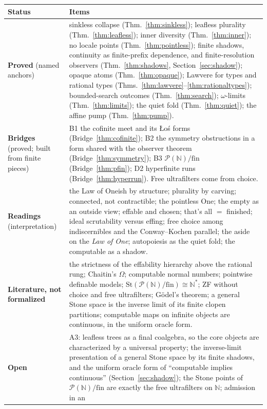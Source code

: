 \documentclass[]{article}
\theoremstyle{definition}
\theoremstyle{remark}
\newcommand{\N}{\mathbb{N}}
\newcommand{\Om}{\Omega}
\newcommand{\Nstar}{\N^{*}}
\newcommand{\Pfin}{\mathcal{P}(\N)/\mathrm{fin}}
\begin{document}
\begin{table}[H]
\centering\small
\begin{tabular}{@{}L{0.25\textwidth}L{0.69\textwidth}@{}}
\toprule
Status & Items \\
\midrule
\textbf{Proved} (named anchors) &
  sinkless collapse (Thm.~\ref{thm:sinkless}); leafless plurality (Thm.~\ref{thm:leafless}); inner
  diversity (Thm.~\ref{thm:inner}); no locale points (Thm.~\ref{thm:pointless}); finite shadows,
  continuity as finite-prefix dependence, and finite-resolution observers (Thm.~\ref{thm:shadows},
  Section~\ref{sec:shadow}); opaque atoms
  (Thm.~\ref{thm:opaque}); Lawvere for types and rational
  types (Thms.~\ref{thm:lawvere}--\ref{thm:rationaltypes}); bounded-search outcomes
  (Thm.~\ref{thm:search}); $\omega$-limits (Thm.~\ref{thm:limits}); the quiet fold
  (Thm.~\ref{thm:quiet}); the affine pump (Thm.~\ref{thm:pump}). \\
\textbf{Bridges} (proved; built from finite pieces) &
  B1 the cofinite meet and its {\L}o\'s forms (Bridge~\ref{thm:cofinite}); B2 the symmetry
  obstructions in a form shared with the observer theorem (Bridge~\ref{thm:symmetry}); B3 $\Pfin$
  (Bridge~\ref{thm:pfin}); D2 hyperfinite runs (Bridge~\ref{thm:hyperrun}). Free ultrafilters come
  from choice. \\
\textbf{Readings} (interpretation) &
  the Law of Oneish by structure; plurality by carving; connected, not contractible; the pointless
  One; the empty as an outside view; effable and chosen; that's all $=$ finished; ideal scrutability
  versus effing; free choice among indiscernibles and the Conway--Kochen parallel; the aside on the
  \emph{Law of One}; autopoiesis as the quiet fold; the computable as a shadow. \\
\textbf{Literature, not formalized} &
  the strictness of the effability hierarchy above the rational rung; Chaitin's $\Om$; computable
  normal numbers; pointwise definable models; $\mathrm{St}(\Pfin)\cong\Nstar$; ZF without choice and
  free ultrafilters; G\"odel's theorem; a general Stone space is the inverse limit of its finite
  clopen partitions; computable maps on infinite objects are continuous, in the uniform oracle
  form. \\
\textbf{Open} &
  A3: leafless trees as a final coalgebra, so the core objects are characterized by a universal
  property; the inverse-limit presentation of a general Stone space by its finite shadows, and the
  uniform oracle form of ``computable implies continuous'' (Section~\ref{sec:shadow}); the Stone points of $\Pfin$ are exactly the free ultrafilters on $\N$; admission in an

\end{tabular}
\end{table}
\end{document}
